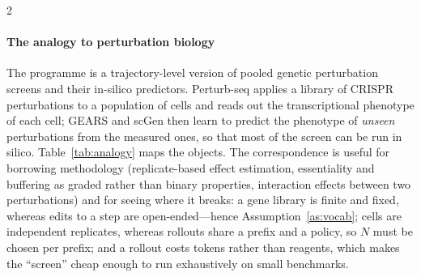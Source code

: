 \begin{multicols}{2}
\paragraph{The analogy to perturbation biology} The programme is a trajectory-level version of pooled genetic perturbation screens and their in-silico predictors. Perturb-seq \cite{dixit2016perturbseq} applies a library of CRISPR perturbations to a population of cells and reads out the transcriptional phenotype of each cell; GEARS \cite{roohani2024gears} and scGen \cite{lotfollahi2019scgen} then learn to predict the phenotype of \emph{unseen} perturbations from the measured ones, so that most of the screen can be run in silico. Table~\ref{tab:analogy} maps the objects. The correspondence is useful for borrowing methodology (replicate-based effect estimation, essentiality and buffering as graded rather than binary properties, interaction effects between two perturbations) and for seeing where it breaks: a gene library is finite and fixed, whereas edits to a step are open-ended---hence Assumption~\ref{as:vocab}; cells are independent replicates, whereas rollouts share a prefix and a policy, so $N$ must be chosen per prefix; and a rollout costs tokens rather than reagents, which makes the ``screen'' cheap enough to run exhaustively on small benchmarks.
\end{multicols}

